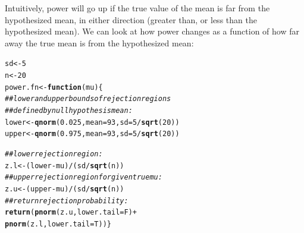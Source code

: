 \documentclass[12pt]{book}\usepackage[]{graphicx}\usepackage[]{color}
\makeatletter
\newcommand{\hlnum}[1]{\textcolor[rgb]{0.686,0.059,0.569}{#1}}%
\newcommand{\hlcom}[1]{\textcolor[rgb]{0.678,0.584,0.686}{\textit{#1}}}%
\newcommand{\hlopt}[1]{\textcolor[rgb]{0,0,0}{#1}}%
\newcommand{\hlstd}[1]{\textcolor[rgb]{0.345,0.345,0.345}{#1}}%
\newcommand{\hlkwa}[1]{\textcolor[rgb]{0.161,0.373,0.58}{\textbf{#1}}}%
\newcommand{\hlkwb}[1]{\textcolor[rgb]{0.69,0.353,0.396}{#1}}%
\newcommand{\hlkwc}[1]{\textcolor[rgb]{0.333,0.667,0.333}{#1}}%
\newcommand{\hlkwd}[1]{\textcolor[rgb]{0.737,0.353,0.396}{\textbf{#1}}}%
\newenvironment{kframe}{%
 \def\at@end@of@kframe{}%
 \ifinner\ifhmode%
  \def\at@end@of@kframe{\end{minipage}}%
  \begin{minipage}{\columnwidth}%
 \fi\fi%
 \def\FrameCommand##1{\hskip\@totalleftmargin \hskip-\fboxsep
 \colorbox{shadecolor}{##1}\hskip-\fboxsep
     \hskip-\linewidth \hskip-\@totalleftmargin \hskip\columnwidth}%
 \MakeFramed {\advance\hsize-\width
   \@totalleftmargin\z@ \linewidth\hsize
   \@setminipage}}%
 {\par\unskip\endMakeFramed%
 \at@end@of@kframe}
\newenvironment{knitrout}{}{} %
\makeatother
\begin{document}
Intuitively, power will go up if the true value of the mean is far from the hypothesized mean, in either direction (greater than, or less than the hypothesized mean). We can look at how power changes as a function of how far away the true mean is from the hypothesized mean:


\begin{knitrout}
\color{fgcolor}\begin{kframe}
\begin{alltt}
\hlstd{sd}\hlkwb{<-}\hlnum{5}
\hlstd{n}\hlkwb{<-}\hlnum{20}
\hlstd{power.fn}\hlkwb{<-}\hlkwa{function}\hlstd{(}\hlkwc{mu}\hlstd{)\{}
\hlcom{## lower and upper bounds of rejection regions}
\hlcom{## defined by null hypothesis mean:}
\hlstd{lower}\hlkwb{<-}\hlkwd{qnorm}\hlstd{(}\hlnum{0.025}\hlstd{,}\hlkwc{mean}\hlstd{=}\hlnum{93}\hlstd{,}\hlkwc{sd}\hlstd{=}\hlnum{5}\hlopt{/}\hlkwd{sqrt}\hlstd{(}\hlnum{20}\hlstd{))}
\hlstd{upper}\hlkwb{<-}\hlkwd{qnorm}\hlstd{(}\hlnum{0.975}\hlstd{,}\hlkwc{mean}\hlstd{=}\hlnum{93}\hlstd{,}\hlkwc{sd}\hlstd{=}\hlnum{5}\hlopt{/}\hlkwd{sqrt}\hlstd{(}\hlnum{20}\hlstd{))}

\hlcom{## lower rejection region:}
\hlstd{z.l}\hlkwb{<-}\hlstd{(lower}\hlopt{-}\hlstd{mu)}\hlopt{/}\hlstd{(sd}\hlopt{/}\hlkwd{sqrt}\hlstd{(n))}
\hlcom{## upper rejection region for given true mu:	}
\hlstd{z.u}\hlkwb{<-}\hlstd{(upper}\hlopt{-}\hlstd{mu)}\hlopt{/}\hlstd{(sd}\hlopt{/}\hlkwd{sqrt}\hlstd{(n))}
\hlcom{## return rejection probability:}
    \hlkwd{return}\hlstd{(}\hlkwd{pnorm}\hlstd{(z.u,}\hlkwc{lower.tail}\hlstd{=F)}\hlopt{+}
          \hlkwd{pnorm}\hlstd{(z.l,}\hlkwc{lower.tail}\hlstd{=T))\}}


\end{alltt}
\end{kframe}
\end{knitrout}
\end{document}
